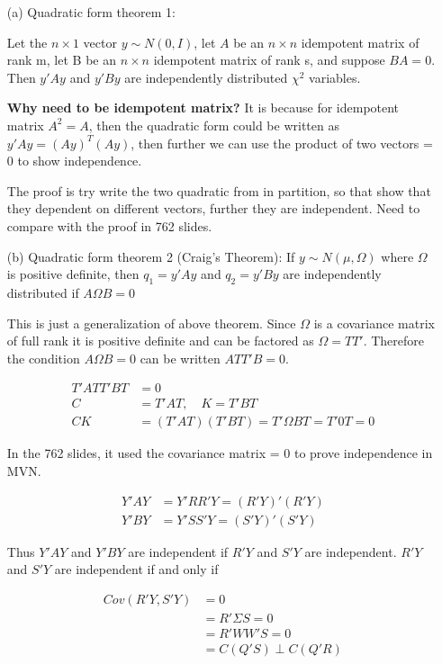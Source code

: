 \begin{itemize}
\item[(a)] Quadratic form theorem 1: 

Let the $n \times 1$ vector $y \sim N(0, I)$, let $A$ be an $n \times n$ idempotent matrix of rank m, let B be an $n \times n$ idempotent matrix of rank s, and suppose $BA = 0$. Then $y'Ay$ and $y'By$ are independently distributed $\chi^2$ variables.

\textbf{Why need to be idempotent matrix?} 
It is because for idempotent matrix $A^2 = A$, then the quadratic form could be written as $ y'Ay = (Ay)^T(Ay)$, then further we can use the product of two vectors = 0 to show independence. 

The proof is try write the two quadratic from in partition, so that show that they dependent on different vectors, further they are independent. Need to compare with the proof in 762 slides.

\item[(b)] Quadratic form theorem 2 (Craig's Theorem):
If $y \sim N(\mu, \Omega)$ where $\Omega$ is positive definite, then $q_1 = y'Ay$ and $q_2= y'By$ are independently distributed if $A\Omega B = 0$

This is just a generalization of above theorem. Since $\Omega$ is a covariance matrix of full rank it is positive definite and can be factored as $\Omega = T T'$.
Therefore the condition $A\Omega B =0$ can be written $ATT'B = 0$. 

\begin{align*}
	T'ATT'BT& = 0\\
	C &= T'AT, \quad K = T'BT \\
	CK &= (T'AT)(T'BT) = T' \Omega B T = T'0T = 0
\end{align*} 

In the 762 slides, it used the covariance matrix = 0 to prove independence in MVN.

\begin{align*}
	Y'AY& = Y' RR' Y = (R'Y)'(R'Y)\\
	Y'BY& = Y' SS' Y = (S'Y)'(S'Y)
\end{align*} 

Thus $Y'AY$ and $Y'BY$ are independent if $R'Y$ and $S'Y$ are independent. $R'Y$ and $S'Y$ are independent if and only if 

\begin{align*}
	Cov(R'Y, S'Y)& =  0\\
	& = R' \Sigma S = 0 \\
	&= R'WW'S = 0 \\
	&= C(Q'S) \perp C(Q'R)
\end{align*} 

\end{itemize}


